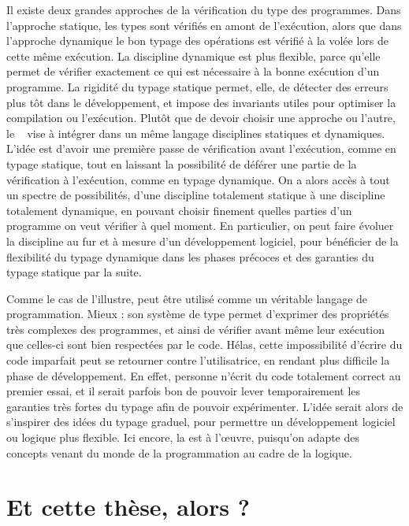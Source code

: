 Il existe deux grandes approches de la vérification du type des programmes.
Dans l’approche statique,
les types sont vérifiés en amont de l’exécution, alors que dans l’approche dynamique le bon typage des opérations est vérifié à la volée lors de cette même exécution.
La discipline dynamique est plus flexible, parce qu’elle permet de vérifier exactement ce qui est nécessaire à la bonne exécution d’un programme.
La rigidité du typage statique permet, elle, de détecter des erreurs plus tôt dans le développement, et impose des invariants utiles pour optimiser la compilation ou l’exécution.
Plutôt que de devoir choisir une approche ou l’autre,
le ~ vise à intégrer
dans un même langage disciplines statiques et dynamiques.
L’idée est d’avoir une première passe de vérification avant l’exécution, comme en typage statique, tout en laissant la possibilité de déférer une partie de la vérification à l’exécution, comme en typage dynamique.
On a alors accès à tout un spectre de possibilités,
d’une discipline totalement statique à une discipline totalement dynamique,
en pouvant choisir finement quelles parties d’un programme on veut vérifier à quel moment.
En particulier, on peut faire évoluer la discipline au fur et à mesure d’un développement
logiciel, pour bénéficier de la flexibilité du typage dynamique dans les phases précoces et des
garanties du typage statique par la suite.

Comme le cas de  l’illustre,  peut être utilisé comme un véritable langage
de programmation. Mieux : son système de type 
permet d’exprimer des propriétés très complexes des programmes, et ainsi de vérifier
avant même leur exécution que celles-ci sont bien respectées par le code.
Hélas, cette impossibilité d’écrire du code imparfait peut
se retourner contre l’utilisatrice, en rendant plus difficile la phase de développement.
En effet, personne n’écrit du code totalement correct au premier essai,
et il serait parfois bon de pouvoir lever temporairement
les garanties très fortes du typage afin de pouvoir expérimenter.
L’idée serait alors de s’inspirer des idées du typage graduel, pour permettre un développement
logiciel ou logique plus flexible. Ici encore, la 
est à l’œuvre, puisqu’on adapte des concepts venant du monde de la programmation
au cadre de la logique.

\section{Et cette thèse, alors ?}
\label{sec:cette-these}

